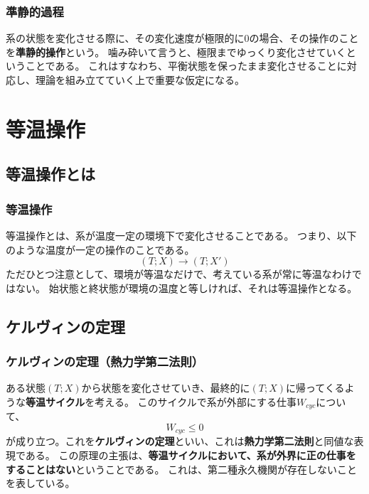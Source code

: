 \documentclass[a4paper]{jsreport}
\begin{document}
            \subsection*{準静的過程}   
                系の状態を変化させる際に、その変化速度が極限的に$0$の場合、その操作のことを\textbf{準静的操作}という。
                噛み砕いて言うと、極限までゆっくり変化させていくということである。
                これはすなわち、平衡状態を保ったまま変化させることに対応し、理論を組み立てていく上で重要な仮定になる。

    \chapter{等温操作}

        \section{等温操作とは}
            \subsection*{等温操作}
                等温操作とは、系が温度一定の環境下で変化させることである。
                つまり、以下のような温度が一定の操作のことである。
                \begin{equation}
                    (T; X)\xrightarrow{}(T; X')
                \end{equation}
                ただひとつ注意として、環境が等温なだけで、考えている系が常に等温なわけではない。
                始状態と終状態が環境の温度と等しければ、それは等温操作となる。
                
        \section{ケルヴィンの定理}
                               
            \subsection*{ケルヴィンの定理（熱力学第二法則）}
                ある状態$(T; X)$から状態を変化させていき、最終的に$(T; X)$に帰ってくるような\textbf{等温サイクル}を考える。
                このサイクルで系が外部にする仕事$W_{cyc}$について、
                \begin{equation}
                    W_{cyc} \le 0
                \end{equation}
                が成り立つ。これを\textbf{ケルヴィンの定理}といい、これは\textbf{熱力学第二法則}と同値な表現である。
                この原理の主張は、\textbf{等温サイクルにおいて、系が外界に正の仕事をすることはない}ということである。
                これは、第二種永久機関が存在しないことを表している。
\end{document}
